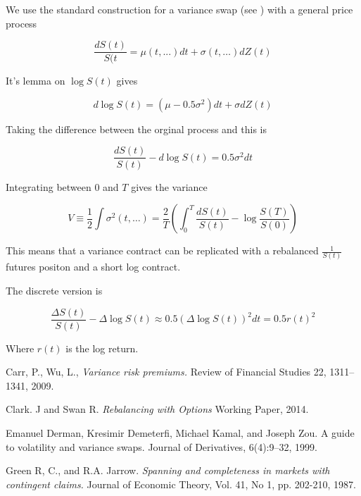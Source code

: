 \documentclass[12pt]{article}
\begin{document}
We use the standard construction for a variance swap (see \cite{Derman99}) with a general price process

\[ \frac{dS(t)}{S(t} = \mu(t,...)dt + \sigma(t,\ldots)dZ(t) \]

It's lemma on $\log S(t)$ gives

\[d \log S(t) = (\mu - 0.5 \sigma^2)dt + \sigma dZ(t) \]

Taking the difference between the orginal process and this is 

\[ \frac{dS(t)}{S(t)} - d\log S(t) = 0.5 \sigma^2 dt \]

Integrating between $0$ and $T$ gives the variance

\[V \equiv \frac{1}{2}\int \sigma^2(t,\ldots) = \frac{2}{T} \left( \int_0^T \frac{dS(t)}{S(t)} -\log \frac{S(T)}{S(0)} \right) \]

This means that a variance contract can be replicated with a rebalanced $\frac{1}{S(t)}$ futures positon and a short log contract.

The discrete version is 

\[ \frac{\Delta S(t)}{S(t)} - \Delta \log S(t) \approx 0.5 (\Delta \log S(t))^2 dt = 0.5 r(t)^2 \]

Where $r(t)$ is the log return.


\begin{thebibliography}{}


 Carr, P., Wu, L., \textit{Variance risk premiums.} Review of Financial Studies 22, 1311–1341, 2009.

 Clark. J and Swan R.  \textit{Rebalancing with Options} Working Paper, 2014.

 Emanuel Derman, Kresimir Demeterfi, Michael Kamal, and Joseph Zou. A guide to volatility
and variance swaps. Journal of Derivatives, 6(4):9–32, 1999.

 Green R, C., and R.A. Jarrow. \textit{Spanning and completeness in markets with contingent claims.}
Journal of Economic Theory, Vol. 41, No 1, pp. 202-210, 1987.






\end{thebibliography}
\end{document}
